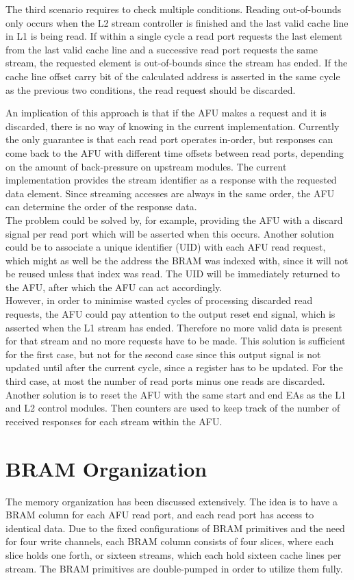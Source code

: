 The third scenario requires to check multiple conditions. Reading out-of-bounds only occurs when the L2 stream controller is finished and the last valid cache line in L1 is being read. If within a single cycle a read port requests the last element from the last valid cache line and a successive read port requests the same stream, the requested element is out-of-bounds since the stream has ended. If the cache line offset carry bit of the calculated address is asserted in the same cycle as the previous two conditions, the read request should be discarded.

An implication of this approach is that if the AFU makes a request and it is discarded, there is no way of knowing in the current implementation. Currently the only guarantee is that each read port operates in-order, but responses can come back to the AFU with different time offsets between read ports, depending on the amount of back-pressure on upstream modules. The current implementation provides the stream identifier as a response with the requested data element. Since streaming accesses are always in the same order, the AFU can determine the order of the response data.\\
The problem could be solved by, for example, providing the AFU with a discard signal per read port which will be asserted when this occurs. Another solution could be to associate a unique identifier (UID) with each AFU read request, which might as well be the address the BRAM was indexed with, since it will not be reused unless that index was read. The UID will be immediately returned to the AFU, after which the AFU can act accordingly.\\
However, in order to minimise wasted cycles of processing discarded read requests, the AFU could pay attention to the output reset end signal, which is asserted when the L1 stream has ended. Therefore no more valid data is present for that stream and no more requests have to be made. This solution is sufficient for the first case, but not for the second case since this output signal is not updated until after the current cycle, since a register has to be updated. For the third case, at most the number of read ports minus one reads are discarded. Another solution is to reset the AFU with the same start and end EAs as the L1 and L2 control modules. Then counters are used to keep track of the number of received responses for each stream within the AFU.





\section{BRAM Organization}
The memory organization has been discussed extensively. The idea is to have a BRAM column for each AFU read port, and each read port has access to identical data. Due to the fixed configurations of BRAM primitives and the need for four write channels, each BRAM column consists of four slices, where each slice holds one forth, or sixteen streams, which each hold sixteen cache lines per stream. The BRAM primitives are double-pumped in order to utilize them fully.

